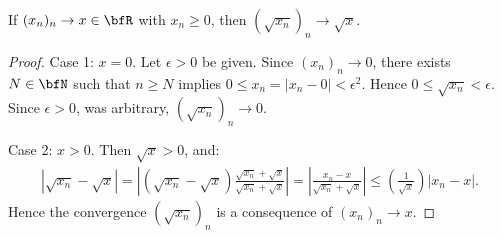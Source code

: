     \begin{lemma}
        If $(x_n)_n \rightarrow x \in \bfR$ with $x_n \geq 0$, then $(\sqrt{x_n})_n \rightarrow \sqrt{x}$.
    \end{lemma}
        \begin{proof}
            Case 1: $x = 0$. Let $\epsilon>0$ be given. Since $(x_n)_n \rightarrow 0$, there exists $N \in \bfN$ such that $n \geq N$ implies $0 \leq x_n = |x_n -0| < \epsilon^2$. Hence $0 \leq \sqrt{x_n} < \epsilon$. Since $\epsilon > 0$, was arbitrary, $(\sqrt{x_n})_n \rightarrow 0$.

            Case 2: $x > 0$. Then $\sqrt{x} > 0$, and:
                \begin{equation*}
                \begin{split}
                    |\sqrt{x_n} - \sqrt{x}| = \left|(\sqrt{x_n}-\sqrt{x})\frac{\sqrt{x_n}+\sqrt{x}}{\sqrt{x_n}+\sqrt{x}}\right| = \left|\frac{x_n - x}{\sqrt{x_n} + \sqrt{x}}\right| \leq \left(\frac{1}{\sqrt{x}}\right)|x_n - x|.
                \end{split}
                \end{equation*}
            Hence the convergence $(\sqrt{x_n})_n$ is a consequence of $(x_n)_n \rightarrow x$.
        \end{proof}

